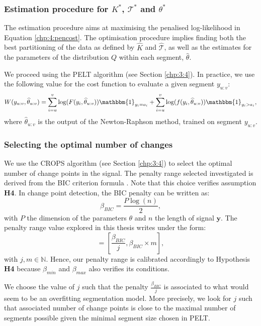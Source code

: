 \subsubsection{Estimation procedure for $K^*$, $\mathcal{T}^*$ and $\theta^*$}

The estimation procedure aims at maximising the penalised log-likelihood in Equation \eqref{chp:4:pencost}. The optimisation procedure implies finding both the best partitioning of the data as defined by $\widehat{K}$ and $\widehat{\mathcal{T}}$, as well as the estimates for the parameters of the distribution $Q$ within each segment, $\widehat{\theta}$. 

We proceed using the PELT algorithm (see Section \ref{chp:3:4}). In practice, we use the following value for the cost function to evaluate a given segment $y_{u:v}$:
\begin{equation}
W(y_{u:v},\widehat{\theta}_{u:v}) = \sum_{i=u}^v\log(F(y_i,\widehat{\theta}_{u:v}))\mathbbm{1}_{y_i=a_i}+\sum_{i=u}^v\log(f(y_i,\widehat{\theta}_{u:v}))\mathbbm{1}_{y_i>a_i},
\end{equation} 
where $\widehat{\theta}_{u:v}$ is the output of the Newton-Raphson method, trained on segment $y_{u:v}$. 

\subsubsection{Selecting the optimal number of changes}

We use the CROPS algorithm (see Section \ref{chp:3:4}) to select the optimal number of change points in the signal. The penalty range selected investigated is derived from the BIC criterion formula \citep{YAO1988181}.  
Note that this choice verifies assumption \textbf{H4}. In change point detection, the BIC penalty can be written as: 
\begin{equation}
\beta_{BIC} = \frac{P\log(n)}{2},
\end{equation}
with $P$ the dimension of the parameters $\theta$ and $n$ the length of signal $\bm y$. The penalty range value explored in this thesis writes under the form: 
\begin{equation}
[\beta_{min},\beta_{max}] = \left[\frac{\beta_{BIC}}{j},\beta_{BIC}\times m\right],
\end{equation}
with $j,m\in\mathbb{N}$. Hence, our penalty range is calibrated accordingly to Hypothesis \textbf{H4} because $\beta_{min}$ and $\beta_{max}$ also verifies its conditions.  

We choose the value of $j$ such that the penalty $\frac{\beta_{BIC}}{j}$ is associated to what would seem to be an overfitting segmentation model. More precisely, we look for $j$ such that associated number of change points is close to the maximal number of segments possible given the minimal segment size chosen in PELT. 

